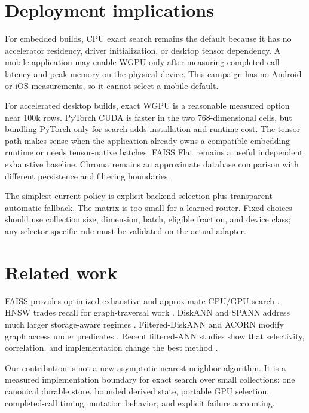 \documentclass[10pt]{article}
\begin{document}
\section{Deployment implications}
For embedded builds, CPU exact search remains the default because it has no accelerator residency, driver initialization, or desktop tensor dependency. A mobile application may enable WGPU only after measuring completed-call latency and peak memory on the physical device. This campaign has no Android or iOS measurements, so it cannot select a mobile default.

For accelerated desktop builds, exact WGPU is a reasonable measured option near 100k rows. PyTorch CUDA is faster in the two 768-dimensional cells, but bundling PyTorch only for search adds installation and runtime cost. The tensor path makes sense when the application already owns a compatible embedding runtime or needs tensor-native batches. FAISS Flat remains a useful independent exhaustive baseline. Chroma remains an approximate database comparison with different persistence and filtering boundaries.

The simplest current policy is explicit backend selection plus transparent automatic fallback. The matrix is too small for a learned router. Fixed choices should use collection size, dimension, batch, eligible fraction, and device class; any selector-specific rule must be validated on the actual adapter.

\section{Related work}
FAISS provides optimized exhaustive and approximate CPU/GPU search \citep{johnson2019billion,douze2024faiss}. HNSW trades recall for graph-traversal work \citep{malkov2020hnsw}. DiskANN and SPANN address much larger storage-aware regimes \citep{subramanya2019diskann,chen2021spann}. Filtered-DiskANN and ACORN modify graph access under predicates \citep{gollapudi2023filtered,patel2024acorn}. Recent filtered-ANN studies show that selectivity, correlation, and implementation change the best method \citep{iff2026fanns,shi2025unified,amanbayev2026systems}.

Our contribution is not a new asymptotic nearest-neighbor algorithm. It is a measured implementation boundary for exact search over small collections: one canonical durable store, bounded derived state, portable GPU selection, completed-call timing, mutation behavior, and explicit failure accounting.
\end{document}
